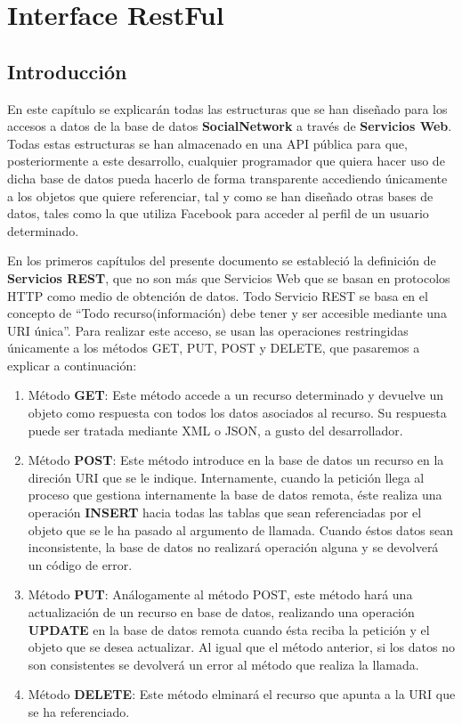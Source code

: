 
\chapter{Interface RestFul} 

\section{Introducción}
En este capítulo se explicarán todas las estructuras que se han diseñado para los accesos a datos de la base de datos \textbf{SocialNetwork} a través de \textbf{Servicios Web}. Todas estas estructuras se han almacenado en una API pública para que, posteriormente a este desarrollo, cualquier programador que quiera hacer uso de dicha base de datos pueda hacerlo de forma transparente accediendo únicamente a los objetos que quiere referenciar, tal y como se han diseñado otras bases de datos, tales como la que utiliza Facebook para acceder al perfil de un usuario determinado.
\bigskip
\par
En los primeros capítulos del presente documento se estableció la definición de \textbf{Servicios REST}, que no son más que Servicios Web que se basan en protocolos HTTP como medio de obtención de datos. Todo Servicio REST se basa en el concepto de ``Todo recurso(información) debe tener y ser accesible mediante una URI única''. Para realizar este acceso, se usan las operaciones restringidas únicamente a los métodos GET, PUT, POST y DELETE, que pasaremos a explicar a continuación:
\bigskip
\par
\begin{enumerate}
\item Método \textbf{GET}: Este método accede a un recurso determinado y devuelve un objeto como respuesta con todos los datos asociados al recurso. Su respuesta puede ser tratada mediante XML o JSON, a gusto del desarrollador.
\item Método \textbf{POST}: Este método introduce en la base de datos un recurso en la direción URI que se le indique. Internamente, cuando la petición llega al proceso que gestiona internamente la base de datos remota, éste realiza una operación \textbf{INSERT} hacia todas las tablas que sean referenciadas por el objeto que se le ha pasado al argumento de llamada. Cuando éstos datos sean inconsistente, la base de datos no realizará operación alguna y se devolverá un código de error.
\item Método \textbf{PUT}: Análogamente al método POST, este método hará una actualización de un recurso en base de datos, realizando una operación \textbf{UPDATE} en la base de datos remota cuando ésta reciba la petición y el objeto que se desea actualizar. Al igual que el método anterior, si los datos no son consistentes se devolverá un error al método que realiza la llamada.
\item Método \textbf{DELETE}: Este método elminará el recurso que apunta a la URI que se ha referenciado. 
\end{enumerate}
